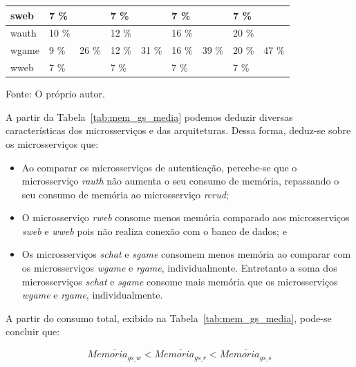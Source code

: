 \begin{table}[htb!]
\begin{adjustbox}{max width=\textwidth}
\begin{tabular}{l|l|l|l|l|l|l|l|l}
sweb                            & 7 \%   &                         & 7 \%   &                         & 7 \%   &                         & 7 \%   &                         \\ \hline \hline
wauth                           & 10 \%  & \multirow{3}{*}{26 \%}  & 12 \%  & \multirow{3}{*}{31 \%}  & 16 \%  & \multirow{3}{*}{39 \%}  & 20 \%  & \multirow{3}{*}{47 \%}  \\ \cline{1-2} \cline{4-4} \cline{6-6} \cline{8-8}
wgame                           & 9 \%   &                         & 12 \%  &                         & 16 \%  &                         & 20 \%  &                         \\ \cline{1-2} \cline{4-4} \cline{6-6} \cline{8-8}
wweb                            & 7 \%   &                         & 7 \%   &                         & 7 \%   &                         & 7 \%   &                         \\ \hline \hline
\end{tabular}
\end{adjustbox}

Fonte: O próprio autor.
\end{table}

A partir da Tabela~\ref{tab:mem_gs_media} podemos deduzir diversas características dos microsserviços e das arquiteturas.
%
Dessa forma, deduz-se sobre os microsserviços que:

\begin{itemize}
 \item Ao comparar os microsserviços de autenticação, percebe-se que o microsserviço \textit{rauth} não aumenta o seu consumo de memória, repassando o seu consumo de memória ao microsserviço \textit{rcrud};
 \item O microsserviço \textit{rweb} consome menos memória comparado aos microsserviços \textit{sweb} e \textit{wweb} pois não realiza conexão com o banco de dados; e
 \item Os microsserviços \textit{schat} e \textit{sgame} consomem menos memória ao comparar com os microsserviços \textit{wgame} e \textit{rgame}, individualmente. Entretanto a soma dos microsserviços \textit{schat} e \textit{sgame} consome mais memória que os microsserviços \textit{wgame} e \textit{rgame}, individualmente.
\end{itemize}

A partir do consumo total, exibido na Tabela~\ref{tab:mem_gs_media}, pode-se concluir que:

$$
    \overline{Memoria_{gs\_w}} < \overline{Memoria_{gs\_r}} < \overline{Memoria_{gs\_s}}
$$

